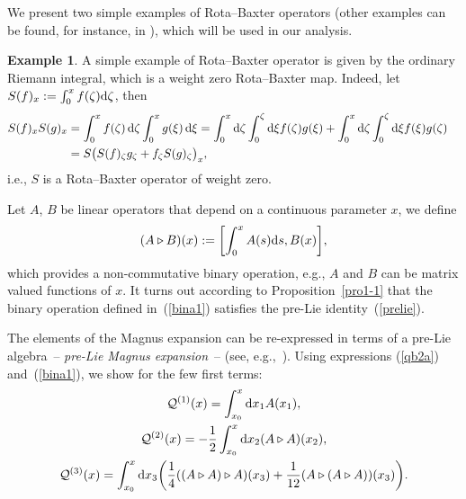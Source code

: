 \documentclass[pdftex]{sigma}
\numberwithin{equation}{section}
\theoremstyle{definition}
\newtheorem{exam}[thm]{Example}
\begin{document}
We present two simple examples of Rota--Baxter operators
(other examples can be found, for instance, in
\cite{EbraMan, new3, new4}), which will be
used in our analysis.
\begin{exam} \label{ex0}
A simple example of Rota--Baxter operator is given by the ordinary Riemann integral, which is a weight
zero Rota--Baxter map. Indeed, let
$S(f)_x := \int_{0}^x f(\zeta) {\rm d}\zeta$, then
\begin{align*}
S(f)_x S(g)_x &= \int_{0}^x f(\zeta) \,{\rm d}\zeta \int_0^x g(\xi) \,{\rm d}\xi
= \int _0^x {\rm d}\zeta \int_0^{\zeta} {\rm d}\xi f(\zeta) g(\xi) + \int _0^x {\rm d}\zeta \int_0^{\zeta}{\rm d}\xi f(\xi) g(\zeta) \cr
&= S\bigl(S(f)_{\zeta}g_{\zeta} + f_{\zeta} S(g)_{\zeta} \bigr)_x,
\end{align*}
i.e., $S$ is a Rota--Baxter operator of weight zero.

Let $A$, $B$ be linear operators that depend on a continuous parameter $x$, we define
\begin{equation}
(A \triangleright B)(x) : = \biggl[ \int_0^x A(s) {\rm d}s, B(x) \biggr], \label{bina1}
\end{equation}
which provides a non-commutative binary operation, e.g., $A$ and $B$
can be matrix valued functions of $x$.
It turns out according to Proposition~\ref{pro1-1} that the binary operation
defined in~(\ref{bina1}) satisfies the pre-Lie identity~(\ref{prelie}).

The elements of the Magnus expansion can be re-expressed in terms of a pre-Lie algebra~-- {\it pre-Lie Magnus expansion}~-- (see, e.g.,~\cite{Fer, EbraMan, new3,new4}).
Using expressions
(\ref{qb2a}) and~(\ref{bina1}), we show for the few first terms:
\begin{gather}
{\mathcal Q}^{(1)}(x) = \int_{x_0}^x {\rm d}x_1 A(x_1), \cr
{\mathcal Q}^{(2)}(x) = - \frac{1}{2} \int_{x_0}^x {\rm d}x_2 (A\triangleright A )(x_2),\cr
 {\mathcal Q}^{(3)}(x) = \int_{x_0}^x{\rm d}x_3 \biggl(\frac{1}{4}((A \triangleright A )
\triangleright A)(x_3) + \frac{1}{12} (A \triangleright (A \triangleright A))
(x_3) \biggr). \label{qb2b}
\end{gather}
\end{exam}
\end{document}
